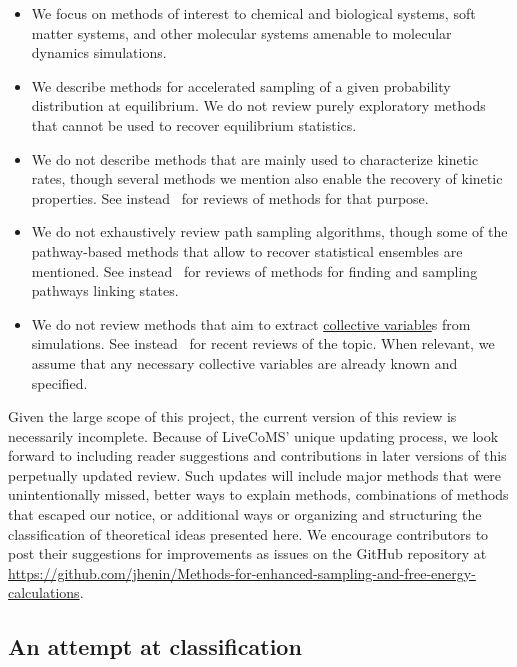 \documentclass[9pt,review]{livecoms}
\begin{document}
\begin{itemize}
    \item We focus on methods of interest to chemical and biological systems, soft matter systems, and other molecular systems amenable to molecular dynamics simulations.
    \item We describe methods for accelerated sampling of a given probability distribution at equilibrium.
    We do not review purely exploratory methods that cannot be used to recover equilibrium statistics.
    \item We do not describe methods that are mainly used to characterize kinetic rates, though several methods we mention also enable the recovery of kinetic properties. See instead~\cite{BRUCE20181,doi:10.1146/annurev-physchem-042018-052340,Dickson:2017:1568-0266:2626,10.1021/acs.biochem.8b00977,https://doi.org/10.1002/wcms.1455,Kieninger2020} for reviews of methods for that purpose.
    \item We do not exhaustively review path sampling algorithms, though some of the pathway-based methods that allow to recover statistical ensembles are mentioned. See instead~\cite{DellagoBolhuis,CHONG201788,Peters2017,Elber2020}
    for reviews of methods for finding and sampling pathways linking states.
    \item We do not review methods that aim to extract \hyperlink{ref:CV} {collective variable}s from simulations. See instead~\cite{WANG2020139,doi:10.1080/00268976.2020.1737742,doi:10.1021/acs.jctc.0c00355} for recent reviews of the topic. When relevant, we assume that any necessary collective variables are already known and specified.
\end{itemize}

Given the large scope of this project, the current version of this review is necessarily incomplete. Because of LiveCoMS' unique updating process, we look forward to including reader suggestions and contributions in later versions of this perpetually updated review. Such updates will include major methods that were unintentionally missed, better ways to explain methods, combinations of methods that escaped our notice, or additional ways or organizing and structuring the classification of theoretical ideas presented here. We encourage contributors to post their suggestions for improvements as issues on the GitHub repository at \url{https://github.com/jhenin/Methods-for-enhanced-sampling-and-free-energy-calculations}.



\subsection{An attempt at classification}
\end{document}
